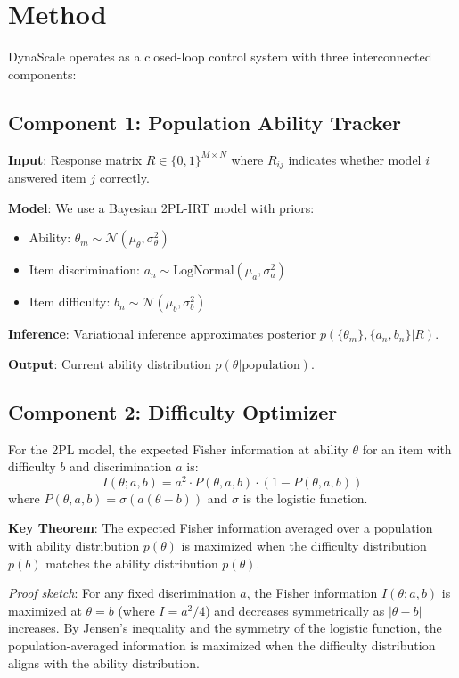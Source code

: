 \documentclass{article}
\begin{document}
\section{Method}
\label{sec:method}

DynaScale operates as a closed-loop control system with three interconnected components:

\subsection{Component 1: Population Ability Tracker}

\textbf{Input}: Response matrix $R \in \{0,1\}^{M \times N}$ where $R_{ij}$ indicates whether model $i$ answered item $j$ correctly.

\textbf{Model}: We use a Bayesian 2PL-IRT model with priors:
\begin{itemize}
    \item Ability: $\theta_m \sim \mathcal{N}(\mu_\theta, \sigma_\theta^2)$
    \item Item discrimination: $a_n \sim \text{LogNormal}(\mu_a, \sigma_a^2)$
    \item Item difficulty: $b_n \sim \mathcal{N}(\mu_b, \sigma_b^2)$
\end{itemize}

\textbf{Inference}: Variational inference approximates posterior $p(\{\theta_m\}, \{a_n, b_n\} | R)$.

\textbf{Output}: Current ability distribution $p(\theta | \text{population})$.

\subsection{Component 2: Difficulty Optimizer}

For the 2PL model, the expected Fisher information at ability $\theta$ for an item with difficulty $b$ and discrimination $a$ is:
\begin{equation}
I(\theta; a, b) = a^2 \cdot P(\theta, a, b) \cdot (1 - P(\theta, a, b))
\end{equation}
where $P(\theta, a, b) = \sigma(a(\theta - b))$ and $\sigma$ is the logistic function.

\textbf{Key Theorem}: The expected Fisher information averaged over a population with ability distribution $p(\theta)$ is maximized when the difficulty distribution $p(b)$ matches the ability distribution $p(\theta)$.

\textit{Proof sketch}: For any fixed discrimination $a$, the Fisher information $I(\theta; a, b)$ is maximized at $\theta = b$ (where $I = a^2/4$) and decreases symmetrically as $|\theta - b|$ increases. By Jensen's inequality and the symmetry of the logistic function, the population-averaged information is maximized when the difficulty distribution aligns with the ability distribution.
\end{document}
